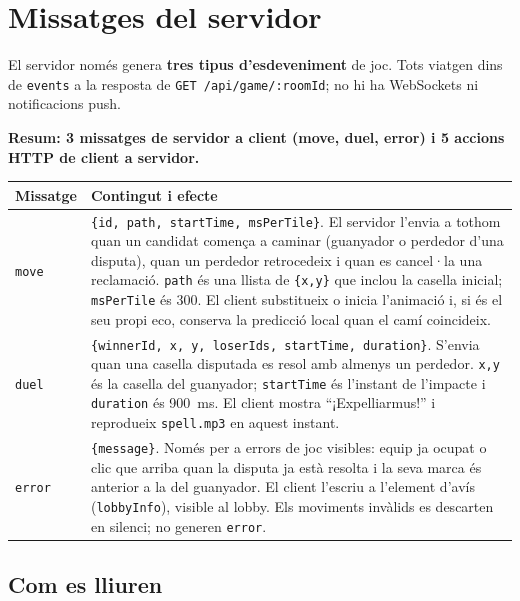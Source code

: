 \documentclass[10pt,a4paper]{article}
\begin{document}
\section{Missatges del servidor}

El servidor només genera \textbf{tres tipus d'esdeveniment} de joc. Tots viatgen dins
de \texttt{events} a la resposta de \texttt{GET /api/game/:roomId}; no hi ha
WebSockets ni notificacions push.

\textbf{Resum: 3 missatges de servidor a client (move, duel, error) i 5 accions HTTP de
client a servidor.}

\begin{table}[ht]
\small
\begin{tabularx}{\textwidth}{@{}p{1.5cm}X@{}}
\toprule
\textbf{Missatge} & \textbf{Contingut i efecte} \\
\midrule
\texttt{move} &
\texttt{\{id, path, startTime, msPerTile\}}. El servidor l'envia a tothom quan un
candidat comença a caminar (guanyador o perdedor d'una disputa), quan un perdedor
retrocedeix i quan es cancel·la una reclamació. \texttt{path} és una llista de
\texttt{\{x,y\}} que inclou la casella inicial; \texttt{msPerTile} és 300. El client
substitueix o inicia l'animació i, si és el seu propi eco, conserva la predicció local
quan el camí coincideix. \\
\texttt{duel} &
\texttt{\{winnerId, x, y, loserIds, startTime, duration\}}. S'envia quan una casella
disputada es resol amb almenys un perdedor. \texttt{x,y} és la casella del guanyador;
\texttt{startTime} és l'instant de l'impacte i \texttt{duration} és 900~ms. El client
mostra \enquote{¡Expelliarmus!} i reprodueix \texttt{spell.mp3} en aquest instant. \\
\texttt{error} &
\texttt{\{message\}}. Només per a errors de joc visibles: equip ja ocupat o clic que
arriba quan la disputa ja està resolta i la seva marca és anterior a la del guanyador.
El client l'escriu a l'element d'avís (\texttt{lobbyInfo}), visible al lobby. Els
moviments invàlids es descarten en silenci; no generen \texttt{error}. \\
\bottomrule
\end{tabularx}
\end{table}

\subsection*{Com es lliuren}
\end{document}
